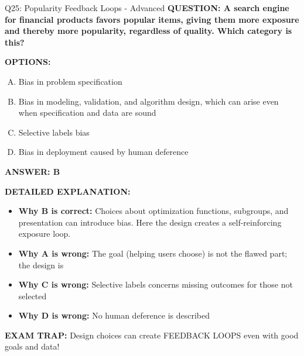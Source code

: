 \documentclass[8pt]{beamer}
\begin{document}
\begin{frame}[shrink=6]{Q25: Popularity Feedback Loops - Advanced}
\fontsize{6.5}{7.5}\selectfont
\textbf{QUESTION: A search engine for financial products favors popular items, giving them more exposure and thereby more popularity, regardless of quality. Which category is this?}

\vspace{0.1cm}
\textbf{OPTIONS:}
\begin{enumerate}[A.]
\item Bias in problem specification
\item Bias in modeling, validation, and algorithm design, which can arise even when specification and data are sound
\item Selective labels bias
\item Bias in deployment caused by human deference
\end{enumerate}

\vspace{0.1cm}
\textcolor{myblue}{\textbf{ANSWER: B}}

\vspace{0.1cm}
\textbf{DETAILED EXPLANATION:}
\begin{itemize}
\item \textbf{Why B is correct:} Choices about optimization functions, subgroups, and presentation can introduce bias. Here the design creates a self-reinforcing exposure loop.
\item \textbf{Why A is wrong:} The goal (helping users choose) is not the flawed part; the design is
\item \textbf{Why C is wrong:} Selective labels concerns missing outcomes for those not selected
\item \textbf{Why D is wrong:} No human deference is described
\end{itemize}

\textcolor{myred}{\textbf{EXAM TRAP:}} Design choices can create FEEDBACK LOOPS even with good goals and data!
\end{frame}
\end{document}
